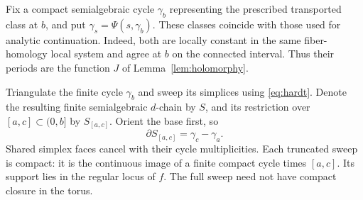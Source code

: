\documentclass[11pt]{article}
\numberwithin{equation}{section}
\theoremstyle{definition}
\theoremstyle{remark}
\begin{document}
Fix a compact semialgebraic cycle $\gamma_b$ representing the prescribed
transported class at $b$, and put $\gamma_s=\Psi(s,\gamma_b)$. These
classes coincide with those used for analytic continuation. Indeed,
both are locally constant in the same fiber-homology local system and
agree at $b$ on the connected interval. Thus their periods are the
function $J$ of Lemma~\ref{lem:holomorphy}.

Triangulate the finite cycle $\gamma_b$ and sweep its simplices using
\eqref{eq:hardt}. Denote the resulting finite semialgebraic $d$-chain
by $S$, and its restriction over $[a,c]\subset(0,b]$ by $S_{[a,c]}$.
Orient the base first, so
\begin{equation}\label{eq:sweep-boundary}
 \partial S_{[a,c]}=\gamma_c-\gamma_a.
\end{equation}
Shared simplex faces cancel with their cycle multiplicities. Each
truncated sweep is compact: it is the continuous image of a finite
compact cycle times $[a,c]$. Its support lies in the regular locus of
$f$. The full sweep need not have compact closure in the torus.
\end{document}
